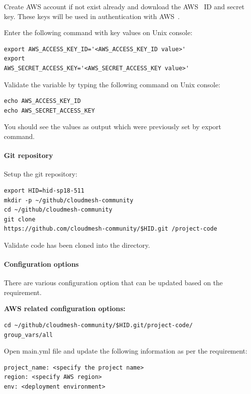 Create AWS account if not exist already and download the
AWS~\cite{hid-sp18-511-www-aws} ID and secret key. These keys will be
used in authentication with AWS~\cite{hid-sp18-511-www-aws}.

Enter the following command with key values on Unix console:

\begin{verbatim}
export AWS_ACCESS_KEY_ID='<AWS_ACCESS_KEY_ID value>' 
export
AWS_SECRET_ACCESS_KEY='<AWS_SECRET_ACCESS_KEY value>'
\end{verbatim}

Validate the variable by typing the following command on Unix console:
\begin{verbatim}
echo AWS_ACCESS_KEY_ID
echo AWS_SECRET_ACCESS_KEY
\end{verbatim}

You should see the values as output which were previously set by
export command.

\paragraph{Git repository}

Setup the git repository:

\begin{verbatim}
export HID=hid-sp18-511 
mkdir -p ~/github/cloudmesh-community
cd ~/github/cloudmesh-community 
git clone
https://github.com/cloudmesh-community/$HID.git /project-code
\end{verbatim}

Validate code has been cloned into the directory.

\paragraph{Configuration options}

There are various configuration option that can be updated based on
the requirement.

\textbf{AWS related configuration options:}

\begin{verbatim}
cd ~/github/cloudmesh-community/$HID.git/project-code/
group_vars/all
\end{verbatim}

Open main.yml file and update the following information as per the
requirement:

\begin{verbatim}
project_name: <specify the project name>
region: <specify AWS region>
env: <deployment environment>
\end{verbatim}


